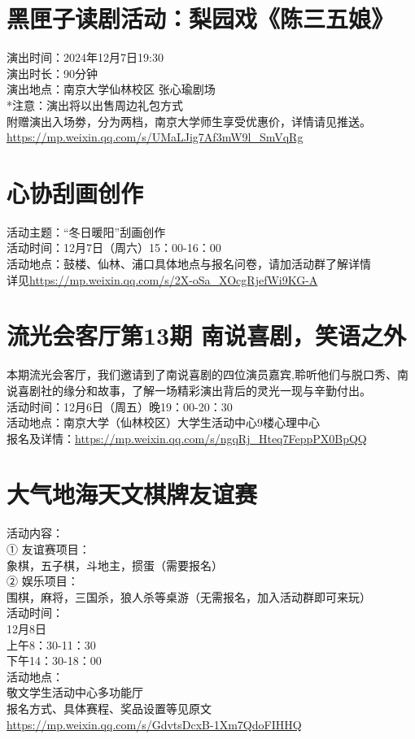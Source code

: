 \documentclass[letterpaper, 12pt]{article}
\begin{document}
\begin{multicols}{2}
\section{黑匣子读剧活动：梨园戏《陈三五娘》}
演出时间：2024年12月7日19:30\\
演出时长：90分钟\\
演出地点：南京大学仙林校区 张心瑜剧场\\
*注意：演出将以出售周边礼包方式\\附赠演出入场劵，分为两档，南京大学师生享受优惠价，详情请见推送。\\
\url{https://mp.weixin.qq.com/s/UMaLJig7Af3mW9l_SmVqRg}

\section{心协刮画创作}
活动主题：“冬日暖阳”刮画创作\\
活动时间：12月7日（周六）15：00-16：00\\
活动地点：鼓楼、仙林、浦口具体地点与报名问卷，请加活动群了解详情\\
详见\url{https://mp.weixin.qq.com/s/2X-oSa_XOcgRjefWi9KG-A}

\section{流光会客厅第13期 南说喜剧，笑语之外}
本期流光会客厅，我们邀请到了南说喜剧的四位演员嘉宾,聆听他们与脱口秀、南说喜剧社的缘分和故事，了解一场精彩演出背后的灵光一现与辛勤付出。\\
活动时间：12月6日（周五）晚19：00-20：30\\
活动地点：南京大学（仙林校区）大学生活动中心9楼心理中心\\
报名及详情：\url{https://mp.weixin.qq.com/s/ngqRj_Hteq7FeppPX0BpQQ}\\

\section{大气地海天文棋牌友谊赛}
活动内容：\\
① 友谊赛项目：\\
象棋，五子棋，斗地主，掼蛋（需要报名）\\
② 娱乐项目：\\
围棋，麻将，三国杀，狼人杀等桌游（无需报名，加入活动群即可来玩）\\
活动时间：\\
12月8日\\
上午8：30-11：30\\
下午14：30-18：00\\
活动地点：\\
敬文学生活动中心多功能厅\\
报名方式、具体赛程、奖品设置等见原文\url{https://mp.weixin.qq.com/s/GdvtsDcxB-1Xm7QdoFIHHQ}


\end{multicols}
\end{document}
